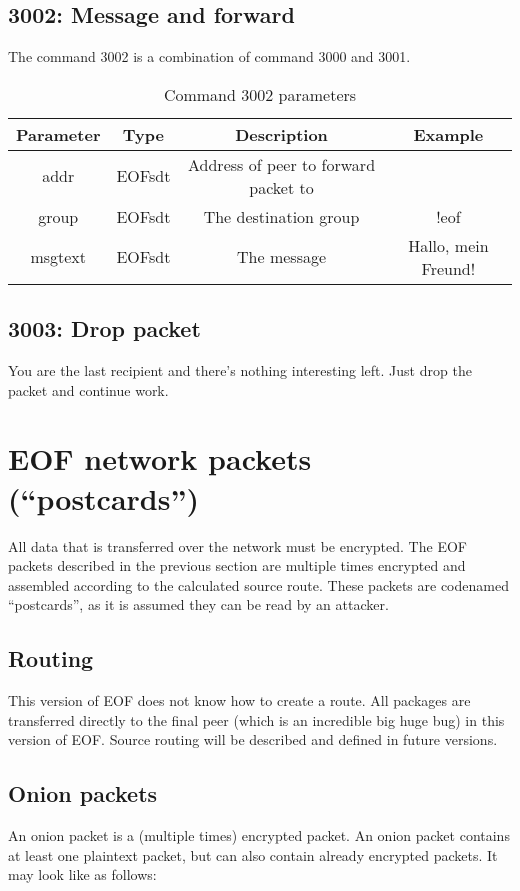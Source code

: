 \documentclass[12pt,a4paper]{book}
\begin{document}
{\subsection{3002: Message and forward}
The command 3002 is a combination of command 3000 and 3001.
%
\begin{longtable}{|c|c|c|c|}
\caption{Command 3002 parameters}\\
\hline
\textbf{Parameter} & \textbf{Type} & \textbf{Description} & \textbf{Example}\\
\hline
addr & EOFsdt & Address of peer to forward packet to&\\
\hline
group & EOFsdt & The destination group & !eof\\
\hline
msgtext & EOFsdt & The message & Hallo, mein Freund!\\
\hline
\end{longtable}
\subsection{3003: Drop packet}
You are the last recipient and there's nothing interesting left.
Just drop the packet and continue work.
\section{EOF network packets ("`postcards"')}
\label{postcards}
All data that is transferred over the network must be encrypted.
The EOF packets described in the previous section are multiple times
encrypted and assembled according to the calculated source route.
These packets are codenamed "`postcards"', as it is assumed they can be read
by an attacker.
\subsection{Routing}
This version of EOF does not know how to create a route.
All packages are transferred directly to the final peer (which is an
incredible big huge bug) in this version of EOF. Source routing will be
described and defined in future versions.
\subsection{Onion packets}
An onion packet is a (multiple times) encrypted packet.
An onion packet contains at least one plaintext packet, but can also contain
already encrypted packets. It may look like as follows:
}
\end{document}
